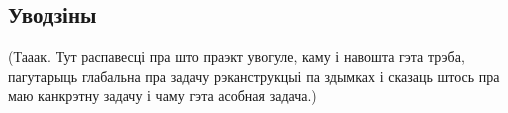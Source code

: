 \begin{center}
    \section*{Уводзіны}    
\end{center}

(Тааак. Тут распавесці пра што праэкт увогуле, каму і навошта гэта трэба, пагутарыць глабальна пра задачу рэканструкцыі па здымках і сказаць штось пра маю канкрэтну задачу і чаму гэта асобная задача.)



\newpage